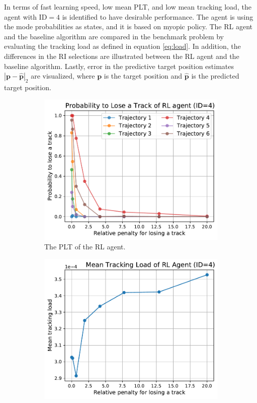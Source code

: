 \documentclass[english, 12pt, a4paper, elec, utf8, a-1b, online]{aaltothesis}
\renewcommand{\vec}[1]{\mathbf{#1}}
\begin{document}
In terms of fast learning speed, low mean PLT, and low mean tracking load, the agent with $\text{ID}=4$ is identified to have desirable performance.
The agent is using the mode probabilities as states, and it is based on myopic policy.
The RL agent and the baseline algorithm are compared in the benchmark problem by evaluating the tracking load as defined in equation \eqref{eq:load}.
In addition, the differences in the RI selections are illustrated between the RL agent and the baseline algorithm.
Lastly, error in the predictive target position estimates $|\vec{p}-\hat{\vec{p}}|_2$ are visualized, where $\vec{p}$ is the target position and $\hat{\vec{p}}$ is the predicted target position.

\begin{figure}
    \centering
    \begin{subfigure}[b]{0.45\textwidth}
        \includegraphics[width=\linewidth]{figures/benchmark/Simulations/plt_agent.pdf}
        \caption{The PLT of the RL agent.}
        \label{fig:penalty_plt}
    \end{subfigure}
    \hfill
    \begin{subfigure}[b]{0.45\textwidth}
        \includegraphics[width=\linewidth]{figures/benchmark/Simulations/tracking_load_agent.pdf}

\end{subfigure}
\end{figure}
\end{document}
